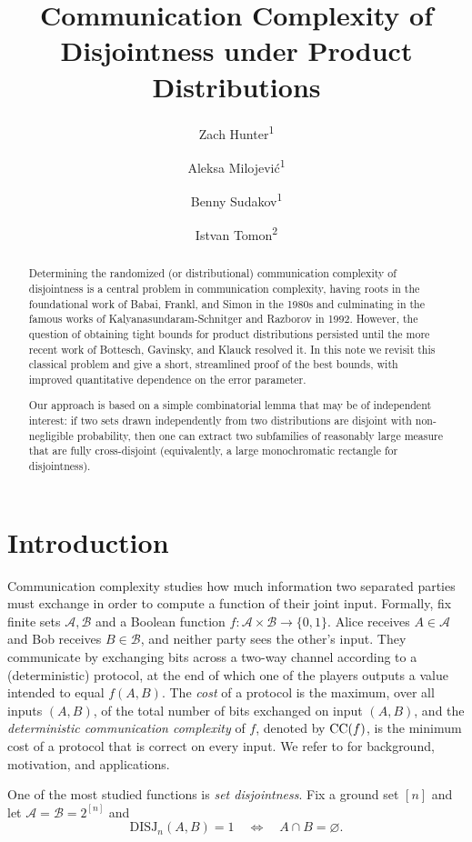 \documentclass[11pt]{amsart}
\title{\vspace{-0.9cm} Communication Complexity of Disjointness under Product Distributions}
\date{}
\author{Zach Hunter\textsuperscript{1}}
\author{Aleksa Milojevi\'c\textsuperscript{1}}
\author{Benny Sudakov\textsuperscript{1}}
\author{Istvan Tomon\textsuperscript{2}}
\theoremstyle{definition}
\def\cA{\mathcal{A}}
\def\cB{\mathcal{B}}
\newcommand{\DISJ}{\mathrm{DISJ}}
\begin{document}
\begin{abstract}
Determining the randomized (or distributional) communication complexity of disjointness is a central problem in communication complexity, having roots in the foundational work of Babai, Frankl, and Simon in the 1980s and culminating in the famous works of Kalyanasundaram-Schnitger and Razborov in 1992. However, the question of obtaining tight bounds for product distributions persisted until the more recent work of Bottesch, Gavinsky, and Klauck resolved it. In this note we revisit this classical problem and give a short, streamlined proof of the best bounds, with improved quantitative dependence on the error parameter. 

Our approach is based on a simple combinatorial lemma that may be of independent interest: if two sets drawn independently from two distributions are disjoint with non-negligible probability, then one can extract two subfamilies of reasonably large measure that are fully cross-disjoint (equivalently, a large monochromatic rectangle for disjointness).  
\end{abstract}

\maketitle

\section{Introduction}

Communication complexity studies how much information two separated parties must exchange in order to compute a function of their joint input.
Formally, fix finite sets $\cA,\cB$ and a Boolean function $f:\cA\times\cB\to\{0,1\}$.
Alice receives $A\in\cA$ and Bob receives $B\in\cB$, and neither party sees the other's input.
They communicate by exchanging bits across a two-way channel according to a (deterministic) protocol, at the end of which one of the players outputs a value intended to equal $f(A,B)$.
The \emph{cost} of a protocol is the maximum, over all inputs $(A,B)$, of the total number of bits exchanged on input $(A,B)$, and the \emph{deterministic communication complexity} of $f$, denoted by ${\rm CC}(f)$, is the minimum cost of a protocol that is correct on every input. We refer to \cite{KN, RY} for background, motivation, and applications.
	
One of the most studied functions is \emph{set disjointness}. Fix a ground set $[n]$ and let $\cA=\cB=2^{[n]}$ and
\[ \DISJ_n(A,B)=1 \quad\Longleftrightarrow\quad A\cap B=\varnothing.\]
\end{document}
